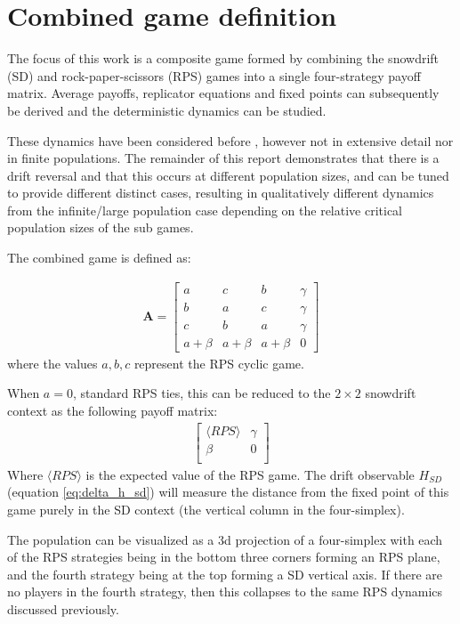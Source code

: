 \documentclass[%
 reprint,
 amsmath,amssymb,
 aps,
]{revtex4-2}
\begin{document}
\section{\label{sec:combined_game}Combined game definition}

The focus of this work is a composite game formed by combining
the snowdrift (SD) and rock-paper-scissors (RPS) games
into a single four-strategy payoff matrix. Average payoffs, 
replicator equations and fixed points can 
subsequently be derived and the deterministic dynamics can be studied.

These dynamics have been considered before \cite{evolution_pop_dynamics}, 
however not in extensive detail nor in finite populations. 
The remainder of this report demonstrates that there 
is a drift reversal and that this occurs at different population sizes, 
and can be tuned to provide different distinct cases, 
resulting in qualitatively different dynamics from the infinite/large 
population case depending on the relative critical population sizes of the sub games. 


The combined game is defined as:

\begin{align}
\label{AugRpsMatrix}
\mathbf{A} =
\begin{bmatrix}
    a & c & b & \gamma\\
    b & a & c & \gamma\\
    c & b & a & \gamma\\
    a + \beta & a + \beta & a + \beta & 0
\end{bmatrix}
\end{align}
where the values $a,b,c$ represent the RPS cyclic game.

When $a = 0$, standard RPS ties, this can be reduced to the $2 \times 2$ snowdrift context as the following
payoff matrix:
\begin{align} \nonumber
\label{CompositeGame}
\begin{bmatrix}
    \langle RPS \rangle & \gamma\\
    \beta & 0 \\
\end{bmatrix}
\end{align}
Where $\langle RPS \rangle$ is the expected value of the RPS game.
The drift observable $H_{SD}$ (equation \ref{eq:delta_h_sd}) will measure the distance
from the fixed point of this game purely in the SD context (the vertical column in the 
four-simplex).

The population can be visualized as a 3d projection of a four-simplex 
with each of the RPS strategies being in the bottom three corners forming an 
RPS plane, and the fourth strategy being at the top forming a SD vertical axis.
If there are no players in the fourth strategy, then this collapses to the 
same RPS dynamics discussed previously.
\end{document}
